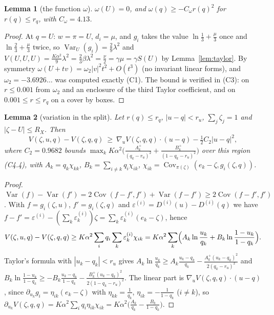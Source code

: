 \documentclass[11pt]{article}
\newtheorem{lemma}{Lemma}[section]
\theoremstyle{definition}
\numberwithin{equation}{section}
\newcommand{\Var}{\operatorname{Var}}
\newcommand{\Cov}{\operatorname{Cov}}
\begin{document}
\begin{lemma}[the function $\omega$]\label{lem:omega}
$\omega(U)=0$, and $\omega(q)\ge-C_\omega r(q)^2$ for $r(q)\le r_q$, with $C_\omega=4.13$.
\end{lemma}
\begin{proof}
At $q=U$: $w=\pi=U$, $d_i=\mu$, and $g_i$ takes the value $\ln\frac13+\frac\mu3$ once and $\ln\frac23+\frac\mu3$ twice, so
$\Var_U(g_i)=\frac29\lambda^2$ and $V(U,U,U)=\frac{K\alpha^2}9\lambda^2=\frac23\beta\lambda^2=\frac\nu2=\gamma\mu=\gamma S(U)$ by
Lemma~\ref{lem:taylor}. By symmetry $\omega(U+tv)=\omega_2|v|^2t^2+O(t^3)$ (no invariant linear forms), and $\omega_2=-3.6926\ldots$ was
computed exactly (C1). The bound is verified in (C3): on $r\le0.001$ from $\omega_2$ and an enclosure of the third Taylor coefficient,
and on $0.001\le r\le r_q$ on a cover by boxes.
\end{proof}

\begin{lemma}[variation in the split]\label{lem:usplit}
Let $r(q)\le r_q$, $|u-q|<r_u$, $\sum_j\zeta_j=1$ and $|\zeta-U|\le R_X$. Then
\[
V(\zeta,u,q)-V(\zeta,q,q)\ \ge\ \nabla_uV(\zeta,q,q)\cdot(u-q)-\tfrac12C_2|u-q|^2,
\]
where $C_2=0.9682$ bounds $\max_kK\alpha^2\bigl(\frac{A_k^+}{(q_k-r_u)^2}+\frac{B_k^+}{(1-q_k-r_u)^2}\bigr)$ over this region (C4.4), with
$A_k=q_k\chi_{kk}$, $B_k=\sum_{i\ne k}q_i\chi_{ik}$, $\chi_{ik}=\Cov_{\pi(\zeta)}(e_k-\zeta,g_i(\zeta,q))$.
\end{lemma}
\begin{proof}
$\Var(f)-\Var(f')=2\Cov(f-f',f')+\Var(f-f')\ge2\Cov(f-f',f')$. With $f=g_i(\zeta,u)$, $f'=g_i(\zeta,q)$ and
$\varepsilon^{(i)}=D^{(i)}(u)-D^{(i)}(q)$ we have $f-f'=\varepsilon^{(i)}-(\sum_k\varepsilon^{(i)}_k)\zeta=\sum_k\varepsilon^{(i)}_k(e_k-\zeta)$, hence
\[
V(\zeta,u,q)-V(\zeta,q,q)\ge K\alpha^2\sum_iq_i\sum_k\varepsilon^{(i)}_k\chi_{ik}=K\alpha^2\sum_k\Bigl(A_k\ln\frac{u_k}{q_k}+B_k\ln\frac{1-u_k}{1-q_k}\Bigr).
\]
Taylor's formula with $|u_k-q_k|<r_u$ gives $A_k\ln\frac{u_k}{q_k}\ge A_k\frac{u_k-q_k}{q_k}-\frac{A_k^+(u_k-q_k)^2}{2(q_k-r_u)^2}$ and
$B_k\ln\frac{1-u_k}{1-q_k}\ge-B_k\frac{u_k-q_k}{1-q_k}-\frac{B_k^+(u_k-q_k)^2}{2(1-q_k-r_u)^2}$. The linear part is $\nabla_uV(\zeta,q,q)\cdot(u-q)$, since
$\partial_{u_k}g_i=\eta_{ik}(e_k-\zeta)$ with $\eta_{kk}=\frac1{q_k}$, $\eta_{ik}=-\frac1{1-q_k}$ ($i\ne k$), so
$\partial_{u_k}V(\zeta,q,q)=K\alpha^2\sum_iq_i\eta_{ik}\chi_{ik}=K\alpha^2\bigl(\frac{A_k}{q_k}-\frac{B_k}{1-q_k}\bigr)$.
\end{proof}
\end{document}
